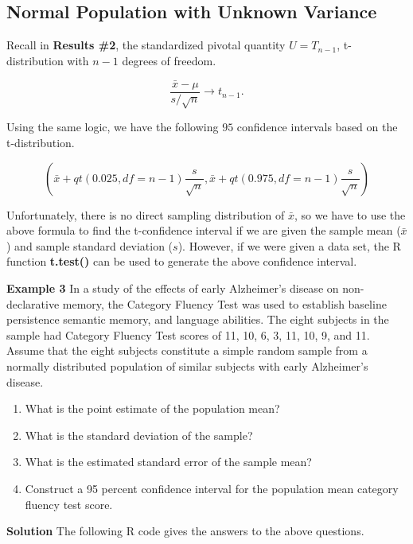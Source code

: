 \documentclass[
]{book}
\begin{document}
\hypertarget{normal-population-with-unknown-variance}{%
\subsection{Normal Population with Unknown Variance}\label{normal-population-with-unknown-variance}}

Recall in \textbf{Results \#2}, the standardized pivotal quantity \(U = T_{n-1}\), t-distribution with \(n-1\) degrees of freedom.

\[\frac{\bar{x}-\mu}{s/\sqrt{n}} \to t_{n-1}.\]

Using the same logic, we have the following \(95%
\) confidence intervals based on the t-distribution.

\[
\left(\bar{x}+qt(0.025, df=n-1)\frac{s}{\sqrt{n}}, \bar{x}+qt(0.975, df=n-1)\frac{s}{\sqrt{n}}\right)
\]

Unfortunately, there is no direct sampling distribution of \(\bar{x}\), so we have to use the above formula to find the t-confidence interval if we are given the sample mean (\(\bar{x}\)) and sample standard deviation (\(s\)). However, if we were given a data set, the R function \textbf{t.test()} can be used to generate the above confidence interval.

\textbf{Example 3} In a study of the effects of early Alzheimer's disease on non-declarative memory, the Category Fluency Test was used to establish baseline persistence semantic memory, and language abilities. The eight subjects in the sample had Category Fluency Test scores of 11, 10, 6, 3, 11, 10, 9, and 11. Assume that the eight subjects constitute a simple random sample from a normally distributed population of similar subjects with early Alzheimer's disease.

\begin{enumerate}
\def\labelenumi{(\alph{enumi})}
\item
  What is the point estimate of the population mean?
\item
  What is the standard deviation of the sample?
\item
  What is the estimated standard error of the sample mean?
\item
  Construct a 95 percent confidence interval for the population mean category fluency test score.
\end{enumerate}

\textbf{Solution} The following R code gives the answers to the above questions.
\end{document}
